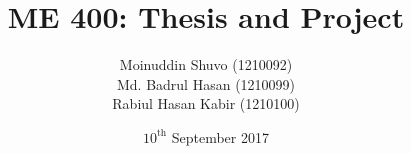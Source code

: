 \documentclass{beamer}
\title[Presentation of Thesis]{ME 400: Thesis and Project}
\author[Bangladesh Universitiy]{\texorpdfstring{%
    Moinuddin Shuvo (1210092)\\ Md. Badrul Hasan (1210099)\\ Rabiul Hasan Kabir (1210100)
}{
    Moinuddin Shuvo (1210092) Md. Badrul Hasan (1210099) Rabiul Hasan Kabir (1210100)
}}
\institute[]{Bangladesh Universitiy of Engineering \& Technology}
\date{$10^{\text{th}}$ September 2017}
\begin{document}
\begin{frame}
  \titlepage
\end{frame}
\end{document}
